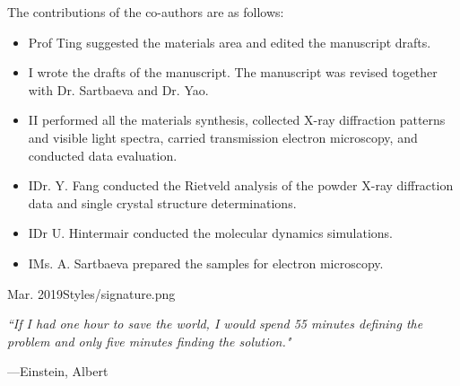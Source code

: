 \documentclass[12pt,a4paper,twoside]{Thesis} %
\theoremstyle{definition}
\begin{document}
{	The contributions of the co-authors are as follows:
	\begin{itemize}[topsep=1pt,itemsep=1pt,partopsep=1pt, parsep=1pt]
		\item Prof Ting suggested the materials area and edited the manuscript drafts.
		\item I wrote the drafts of the manuscript.  The manuscript was revised together with Dr. Sartbaeva and Dr. Yao.
		\item II performed all the materials synthesis, collected X-ray diffraction patterns and visible light spectra, carried transmission electron microscopy, and conducted data evaluation.
		\item IDr. Y. Fang conducted the Rietveld analysis of the powder X-ray diffraction data and single crystal structure determinations.
		\item IDr U. Hintermair conducted the molecular dynamics simulations.
		\item IMs. A. Sartbaeva prepared the samples for electron microscopy.
	\end{itemize}
}{Mar. 2019}{Styles/signature.png}





\pagestyle{empty} %
\emph{``If I had one hour to save the world, I would spend 55 minutes defining the problem and only five minutes finding the solution."}

\begin{flushright}
---Einstein, Albert
\end{flushright}
\null\vfill %
\end{document}
